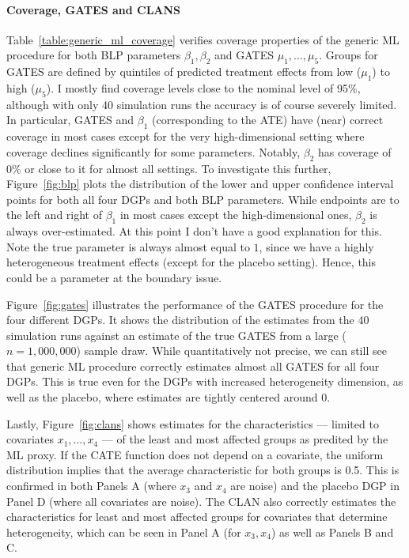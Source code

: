 \documentclass[11pt, a4paper, leqno]{article}
\begin{document}
\paragraph*{Coverage, GATES and CLANS}
Table~\ref*{table:generic_ml_coverage} verifies coverage properties of the generic ML procedure for both BLP parameters $\beta_1, \beta_2$ and GATES $\mu_1, \ldots, \mu_5$.
Groups for GATES are defined by quintiles of predicted treatment effects from low ($\mu_1$) to high ($\mu_5$).
I mostly find coverage levels close to the nominal level of 95\%, although with only 40 simulation runs the accuracy is of course severely limited.
In particular, GATES and $\beta_1$ (corresponding to the ATE) have (near) correct coverage in most cases except for the very high-dimensional setting where coverage declines significantly for some parameters. Notably, $\beta_2$ has coverage of $0\%$ or close to it for almost all settings.
To investigate this further, Figure~\ref*{fig:blp} plots the distribution of the lower and upper confidence interval points for both all four DGPs and both BLP parameters.
While endpoints are to the left and right of $\beta_1$ in most cases except the high-dimensional ones, $\beta_2$ is always over-estimated.
At this point I don't have a good explanation for this. Note the true parameter is always almost equal to $1$, since we have a highly heterogeneous treatment effects (except for the placebo setting).
Hence, this could be a parameter at the boundary issue.

Figure~\ref*{fig:gates} illustrates the performance of the GATES procedure for the four different DGPs\@.
It shows the distribution of the estimates from the 40 simulation runs against an estimate of the true GATES from a large ($n=1,000,000$) sample draw.
While quantitatively not precise, we can still see that generic ML procedure correctly estimates almost all GATES for all four DGPs.
This is true even for the DGPs with increased heterogeneity dimension, as well as the placebo, where estimates are tightly centered around 0.

Lastly, Figure~\ref*{fig:clans} shows estimates for the characteristics --- limited to covariates $x_1, \ldots, x_4$ --- of the least and most affected groups as predited by the ML proxy.
If the CATE function does not depend on a covariate, the uniform distribution implies that the average characteristic for both groups is 0.5.
This is confirmed in both Panels A (where $x_3$ and $x_4$ are noise) and the placebo DGP in Panel D (where all covariates are noise).
The CLAN also correctly estimates the characteristics for least and most affected groups for covariates that determine heterogeneity, which can be seen in Panel A (for $x_3, x_4$) as well as Panels B and C.
\end{document}
